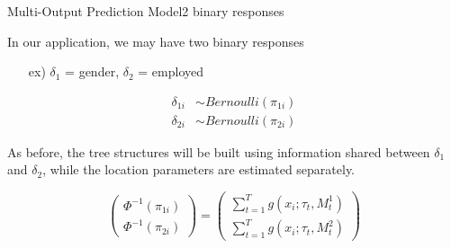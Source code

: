\documentclass{beamer}
\begin{document}


\begin{frame}{Multi-Output Prediction Model}{2 binary responses}

In our application, we may have two binary responses
\begin{itemize}
\item[ex)] $\delta_1$ = gender, $\delta_2$ = employed
\end{itemize}


\begin{align}
\delta_{1i} &\sim Bernoulli(\pi_{1i}) \\
\delta_{2i} &\sim Bernoulli(\pi_{2i})
\end{align}

As before, the tree structures will be built using information shared between $\delta_1$ and $\delta_2$, while the location parameters are estimated separately. 

$$\begin{pmatrix}\Phi^{-1}(\pi_{1i}) \\ \Phi^{-1}(\pi_{2i}) \end{pmatrix} = 
\begin{pmatrix}\sum_{t=1}^T g(x_i ; \tau_t, M^{1}_t)\\%
\sum_{t=1}^T g(x_i ; \tau_t, M^{2}_t)%
\end{pmatrix} $$


\end{frame}
\end{document}
